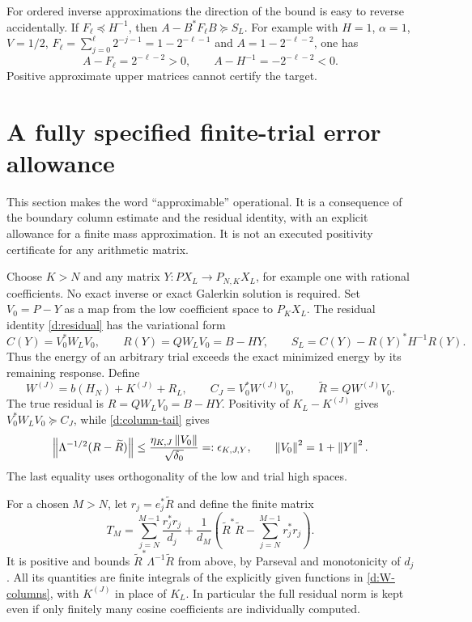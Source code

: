 For ordered inverse approximations the direction of the bound is easy
to reverse accidentally. If $F_\ell\preceq H^{-1}$, then
$A-B^*F_\ell B\succeq S_L$.
For example with $H=1$, $\alpha=1$, $V=1/2$,
$F_\ell=\sum_{j=0}^\ell 2^{-j-1}=1-2^{-\ell-1}$ and
$A=1-2^{-\ell-2}$, one has
\[
A-F_\ell=2^{-\ell-2}>0,\qquad A-H^{-1}=-2^{-\ell-2}<0.
\]
Positive approximate upper matrices cannot certify the target.

\section{A fully specified finite-trial error allowance}
This section makes the word ``approximable'' operational. It is a
consequence of the boundary column estimate and the residual identity,
with an explicit allowance for a finite mass approximation. It is not
an executed positivity certificate for any arithmetic matrix.

Choose $K>N$ and any matrix $Y:PX_L\to P_{N,K}X_L$, for example one
with rational coefficients. No exact inverse or exact Galerkin solution
is required. Set $V_0=P-Y$ as a map from the low coefficient space to
$P_KX_L$. The residual identity \eqref{d:residual} has the variational form
\begin{equation}\label{d:variational}
C(Y)=V_0^*W_LV_0,\qquad R(Y)=QW_LV_0=B-HY,\qquad
S_L=C(Y)-R(Y)^*H^{-1}R(Y).
\end{equation}
Thus the energy of an arbitrary trial exceeds the exact minimized energy
by its remaining response. Define
\[
W^{(J)}=b(H_N)+K^{(J)}+R_L,\qquad
C_J=V_0^*W^{(J)}V_0,\qquad\widetilde R=QW^{(J)}V_0.
\]
The true residual is $R=QW_LV_0=B-HY$. Positivity of $K_L-K^{(J)}$
gives $V_0^*W_LV_0\succeq C_J$, while \eqref{d:column-tail} gives
\begin{equation}\label{d:residual-error}
\left\lVert\Lambda^{-1/2}(R-\widetilde R)\right\rVert
\le\frac{\eta_{K,J}\left\lVert V_0\right\rVert}{\sqrt{\delta_0}}
=:\epsilon_{K,J,Y},\qquad\left\lVert V_0\right\rVert^2=1+\left\lVert Y\right\rVert^2.
\end{equation}
The last equality uses orthogonality of the low and trial high spaces.

For a chosen $M>N$, let $r_j=e_j^*\widetilde R$ and define the finite
matrix
\begin{equation}\label{d:weighted-tail}
T_M=\sum_{j=N}^{M-1}\frac{r_j^*r_j}{d_j}
+\frac1{d_M}\left(\widetilde R^*\widetilde R-
\sum_{j=N}^{M-1}r_j^*r_j\right).
\end{equation}
It is positive and bounds $\widetilde R^*\Lambda^{-1}\widetilde R$ from
above, by Parseval and monotonicity of $d_j$. All its quantities are finite
integrals of the explicitly given functions in \eqref{d:W-columns}, with
$K^{(J)}$ in place of $K_L$. In particular the full residual norm is kept
even if only finitely many cosine coefficients are individually computed.

